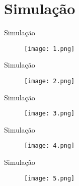 \section{Simulação}

\begin{frame}{Simulação}

  \begin{figure}[ht]
    \begin{minipage}[b]{0.35\linewidth}
      \centering
      \texttt{[image: 1.png]}
    \end{minipage}

  \end{figure}

\end{frame}

\begin{frame}{Simulação}

  \begin{figure}[ht]
    \begin{minipage}[b]{0.35\linewidth}
      \centering
      \texttt{[image: 2.png]}
    \end{minipage}

  \end{figure}

\end{frame}

\begin{frame}{Simulação}

  \begin{figure}[ht]
    \begin{minipage}[b]{0.35\linewidth}
      \centering
      \texttt{[image: 3.png]}
    \end{minipage}

  \end{figure}

\end{frame}

\begin{frame}{Simulação}

  \begin{figure}[ht]
    \begin{minipage}[b]{0.35\linewidth}
      \centering
      \texttt{[image: 4.png]}
    \end{minipage}

  \end{figure}

\end{frame}

\begin{frame}{Simulação}

  \begin{figure}[ht]
    \begin{minipage}[b]{0.35\linewidth}
      \centering
      \texttt{[image: 5.png]}
    \end{minipage}

  \end{figure}

\end{frame}

